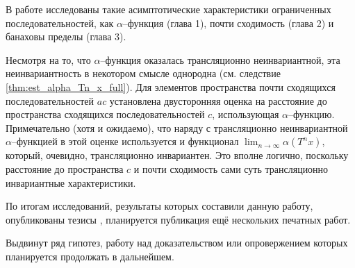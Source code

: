 В работе исследованы такие асимптотические характеристики ограниченных последовательностей,
как $\alpha$--функция (глава 1),  почти сходимость (глава 2) и банаховы пределы (глава 3).

Несмотря на то, что $\alpha$--функция оказалась трансляционно неинвариантной,
эта неинвариантность в некотором смысле однородна (см. следствие \ref{thm:est_alpha_Tn_x_full}).
Для элементов пространства почти сходящихся последовательностей $ac $
установлена двусторонняя оценка на расстояние до пространства сходящихся последовательностей $c$,
использующая $\alpha$--функцию.
Примечательно (хотя и ожидаемо), что наряду с трансляционно неинвариантной $\alpha$--функцией
в этой оценке используется и функционал $\lim_{n\to\infty}\alpha(T^n x)$,
который, очевидно, трансляционно инвариантен.
Это вполне логично, поскольку расстояние до пространства $c$ и почти сходимость
сами суть трансляционно инвариантные характеристики.




По итогам исследований, результаты которых составили данную работу,
опубликованы тезисы \cite{our-vvmsh-2018,our-vzms-2018,our-ped-2018-inf-dim-ker,our-ped-2018-alpha-Tx},
планируется публикация ещё нескольких печатных работ.

Выдвинут ряд гипотез,
работу над доказательством или опровержением которых планируется продолжать в дальнейшем.
